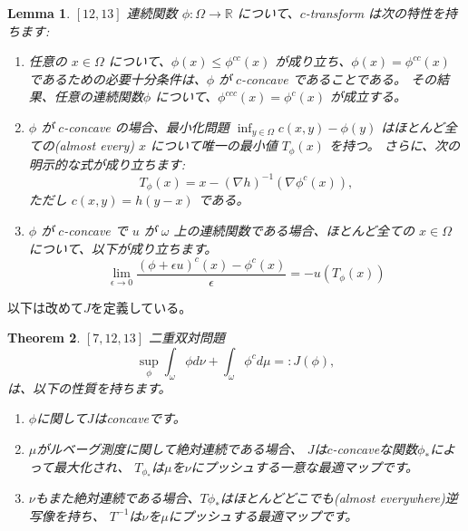 \documentclass{jsarticle}
\newtheorem{thm}{Theorem}[section]
\newtheorem{lem}[thm]{Lemma}
\theoremstyle{definition}
\begin{document}
\begin{lem}
  \label{lem:c-transform}
  $\left[ 12, 13 \right]$
  連続関数 $\phi: \Omega \to \mathbb{R}$ について、$c$-transform は次の特性を持ちます:
  \begin{enumerate}
  \item 任意の $x \in \Omega$ について、$\phi(x) \le \phi^{cc}(x)$ が成り立ち、$\phi(x) = \phi^{cc}(x)$ であるための必要十分条件は、$\phi$ が $c$-concave であることである。
  その結果、任意の連続関数$\phi$ について、$\phi^{ccc}(x) = \phi^{c}(x)$ が成立する。
  
  \item $\phi$ が $c$-concave の場合、最小化問題 $\inf_{y \in \Omega} c(x, y) - \phi(y)$ はほとんど全ての(almost every) $x$ について唯一の最小値 $T_\phi(x)$ を持つ。
  さらに、次の明示的な式が成り立ちます:
  \begin{equation*}
    T_\phi(x) = x - (\nabla h)^{-1}(\nabla \phi^c(x)),
  \end{equation*}
  ただし $c(x, y) = h(y - x)$ である。
  
  \item $\phi$ が $c$-concave で $u$ が $\omega$ 上の連続関数である場合、ほとんど全ての $x \in \Omega$ について、以下が成り立ちます。
  \begin{equation*}
    \label{eq:c-transform lim}
    \lim_{\epsilon \to 0} \frac{(\phi + \epsilon u)^c(x) - \phi^c(x)}{\epsilon} = - u(T_\phi(x)) 
  \end{equation*}
  \end{enumerate}
\end{lem}

以下は改めて$J$を定義している。
\begin{thm}
  $\left[ 7,12,13 \right]$ 
  二重双対問題
  \begin{equation*}
    \sup_\phi \int_\omega \phi  d \nu + \int_\omega \phi^c  d \mu =: J(\phi),
  \end{equation*}
  は、以下の性質を持ちます。

  \begin{enumerate}
    \item $\phi$に関して$J$はconcaveです。
    
    \item $\mu$がルベーグ測度に関して絶対連続である場合、
    $J$は$c$-concaveな関数$\phi_*$によって最大化され、
    $T_{\phi_*}$は$\mu$を$\nu$にプッシュする一意な最適マップです。
    
    \item $\nu$もまた絶対連続である場合、$T\phi_*$はほとんどどこでも(almost everywhere)逆写像を持ち、
    $T^{-1}$は$\nu$を$\mu$にプッシュする最適マップです。
  \end{enumerate}
\end{thm}
\end{document}
